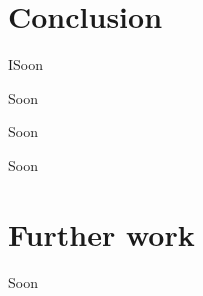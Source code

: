 
\section{Conclusion}\label{sec:6.1}
\vspace{-0.5cm}
\noindent ISoon


\vspace{-0.5cm}
\par
\noindent Soon

\vspace{-0.5cm}
\par
\noindent Soon


\vspace{-0.5cm}
\par
\noindent Soon



\newpage
\vspace{-0.3cm}
\section{Further work} \label{sec:6.2}\label{sec5.1}
\vspace{-0.5cm}
\noindent Soon



